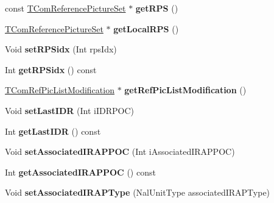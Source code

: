 \begin{DoxyCompactItemize}
const \hyperlink{class_t_com_reference_picture_set}{T\+Com\+Reference\+Picture\+Set} $\ast$ {\bfseries get\+R\+PS} ()
\item 
\mbox{\label{class_t_com_slice_a379d9df4f834563f46fd3786ff16b93c}} 
\hyperlink{class_t_com_reference_picture_set}{T\+Com\+Reference\+Picture\+Set} $\ast$ {\bfseries get\+Local\+R\+PS} ()
\item 
\mbox{\label{class_t_com_slice_a2ab306e9cde5d046ed30e4a396e7f0f8}} 
Void {\bfseries set\+R\+P\+Sidx} (Int rps\+Idx)
\item 
\mbox{\label{class_t_com_slice_af39a36fb50f8451c5de2b67ba9f7fa1a}} 
Int {\bfseries get\+R\+P\+Sidx} () const
\item 
\mbox{\label{class_t_com_slice_ac6dddedc5caecb2e6384697854098b98}} 
\hyperlink{class_t_com_ref_pic_list_modification}{T\+Com\+Ref\+Pic\+List\+Modification} $\ast$ {\bfseries get\+Ref\+Pic\+List\+Modification} ()
\item 
\mbox{\label{class_t_com_slice_aae7aacfcf08c9bbb1766b67a69343e3e}} 
Void {\bfseries set\+Last\+I\+DR} (Int i\+I\+D\+R\+P\+OC)
\item 
\mbox{\label{class_t_com_slice_a99386d824431f31c38378dda33613372}} 
Int {\bfseries get\+Last\+I\+DR} () const
\item 
\mbox{\label{class_t_com_slice_adf45a20d1d023c287dce1ecfbca0fdff}} 
Void {\bfseries set\+Associated\+I\+R\+A\+P\+P\+OC} (Int i\+Associated\+I\+R\+A\+P\+P\+OC)
\item 
\mbox{\label{class_t_com_slice_a154c28f786cb31abfe6be737595c2e0c}} 
Int {\bfseries get\+Associated\+I\+R\+A\+P\+P\+OC} () const
\item 
\mbox{\label{class_t_com_slice_aa5d72dfa4fced1872b718ddafcad4d34}} 
Void {\bfseries set\+Associated\+I\+R\+A\+P\+Type} (Nal\+Unit\+Type associated\+I\+R\+A\+P\+Type)
\item 
\mbox{\label{class_t_com_slice_a9bf5c1cfad69632942bf4853f91bf974}} 

\end{DoxyCompactItemize}
